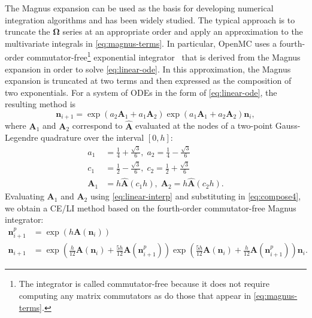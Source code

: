 \documentclass[3p,authoryear]{elsarticle}
\newcommand{\vect}[1]{\mathbf{#1}} %
\begin{document}
The Magnus expansion can be used as the basis for developing numerical
integration algorithms and has been widely studied. The typical approach is to
truncate the $\vect{\Omega}$ series at an appropriate order and apply an
approximation to the multivariate integrals in \cref{eq:magnus-terms}. In
particular, OpenMC uses a fourth-order commutator-free\footnote{The integrator
is called commutator-free because it does not require computing any matrix
commutators as do those that appear in \cref{eq:magnus-terms}.} exponential
integrator~\citep{blanes2006anm} that is derived from the Magnus expansion in
order to solve \cref{eq:linear-ode}. In this approximation, the Magnus expansion
is truncated at two terms and then expressed as the composition of two
exponentials. For a system of ODEs in the form of \cref{eq:linear-ode}, the
resulting method is
\begin{equation}
  \label{eq:compose4}
  \vect{n}_{i+1} = \exp (a_2 \vect{A}_1 + a_1 \vect{A}_2)
  \exp (a_1 \vect{A}_1 + a_2 \vect{A}_2) \vect{n}_i ,
\end{equation}
where $\vect{A}_1$ and $\vect{A}_2$ correspond to $\hat{\vect{A}}$ evaluated at
the nodes of a two-point Gauss-Legendre quadrature over the interval $[0,h]$:
\begin{equation}
  \begin{split}
    a_1 &= \frac{1}{4} + \frac{\sqrt{3}}{6}, \; a_2 = \frac{1}{4} - \frac{\sqrt{3}}{6} \\
    c_1 &= \frac{1}{2} - \frac{\sqrt{3}}{6}, \; c_2 = \frac{1}{2} + \frac{\sqrt{3}}{6} \\
    \vect{A}_1 &= h\hat{\vect{A}}\left ( c_1 h\right ), \; \vect{A}_2 = h\hat{\vect{A}}\left ( c_2 h\right ).
  \end{split}
\end{equation}
Evaluating $\vect{A}_1$ and $\vect{A}_2$ using \cref{eq:linear-interp} and
substituting in \cref{eq:compose4}, we obtain a CE/LI method based on the
fourth-order commutator-free Magnus integrator:
\begin{equation}
  \label{eq:celi-cfq4}
  \begin{split}
  \vect{n}_{i+1}^p &= \exp \left ( h \vect{A}(\vect{n}_i ) \right ) \\
  \vect{n}_{i+1} &= \exp \left( \frac{h}{12} \vect{A}(\vect{n}_i) +
    \frac{5h}{12} \vect{A}(\vect{n}_{i+1}^p) \right)
  \exp \left( \frac{5h}{12} \vect{A}(\vect{n}_i) +
  \frac{h}{12} \vect{A}(\vect{n}_{i+1}^p) \right) \vect{n}_i.
  \end{split}
\end{equation}
\end{document}
